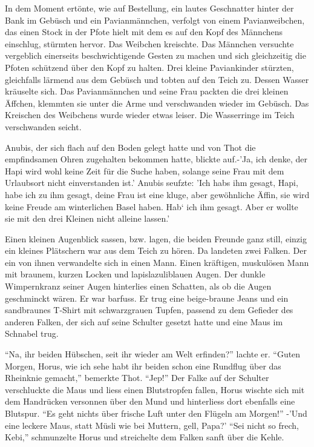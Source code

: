 \documentclass[11pt,titlepage,a5paper]{book}
\begin{document}
In dem Moment ertönte, wie auf Bestellung, ein lautes Geschnatter hinter der Bank im Gebüsch und ein Pavianmännchen, verfolgt von einem Pavianweibchen, das einen Stock in der Pfote hielt mit dem es auf den Kopf des Männchens einschlug, stürmten hervor. Das Weibchen kreischte. Das Männchen versuchte vergeblich einerseits beschwichtigende Gesten zu machen und sich gleichzeitig die Pfoten schützend über den Kopf zu halten. Drei kleine Paviankinder stürzten, gleichfalls lärmend aus dem Gebüsch und tobten auf den Teich zu. Dessen Wasser kräuselte sich. Das Pavianmännchen und seine Frau packten die drei kleinen Äffchen, klemmten sie unter die Arme und verschwanden wieder im Gebüsch. Das Kreischen des Weibchens wurde wieder etwas leiser. Die Wasserringe im Teich verschwanden seicht.

Anubis, der sich flach auf den Boden gelegt hatte und von Thot die empfindsamen Ohren zugehalten bekommen hatte, blickte auf.-'Ja, ich denke, der Hapi wird wohl keine Zeit für die Suche haben, solange seine Frau mit dem Urlaubsort nicht einverstanden ist.' Anubis seufzte: 'Ich habs ihm gesagt, Hapi, habe ich zu ihm gesagt, deine Frau ist eine kluge, aber gewöhnliche Äffin, sie wird keine Freude am winterlichen Basel haben. Hab` ich ihm gesagt. Aber er wollte sie mit den drei Kleinen nicht alleine lassen.'

Einen kleinen Augenblick sassen, bzw. lagen, die beiden Freunde ganz still, einzig ein kleines Plätschern war aus dem Teich zu hören. Da landeten zwei Falken. Der ein von ihnen verwandelte sich in einen Mann. Einen kräftigen, muskulösen Mann mit braunem, kurzen Locken und lapislazuliblauen Augen. Der dunkle Wimpernkranz seiner Augen hinterlies einen Schatten, als ob die Augen geschminckt wären. Er war barfuss. Er trug eine beige-braune Jeans und ein sandbraunes T-Shirt mit schwarzgrauen Tupfen, passend zu dem Gefieder des anderen Falken, der sich auf seine Schulter gesetzt hatte und eine Maus im Schnabel trug. 

"`Na, ihr beiden Hübschen, seit ihr wieder am Welt erfinden?"' lachte er. "`Guten Morgen, Horus, wie ich sehe habt ihr beiden schon eine Rundflug über das Rheinknie gemacht,"' bemerkte Thot. "`Jep!"' Der Falke auf der Schulter verschluckte die Maus und liess einen Blutstropfen fallen, Horus wischte sich mit dem Handrücken versonnen über den Mund und hinterliess dort ebenfalls eine Blutspur. "`Es geht nichts über frische Luft unter den Flügeln am Morgen!"' -'Und eine leckere Maus, statt Müsli wie bei Muttern, gell, Papa?' "`Sei nicht so frech, Kebi,"' schmunzelte Horus und streichelte dem Falken sanft über die Kehle. 
\end{document}
